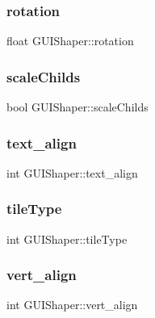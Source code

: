\subsubsection{\texorpdfstring{rotation}{rotation}}
{\footnotesize\ttfamily float G\+U\+I\+Shaper\+::rotation}

\hypertarget{class_g_u_i_shaper_a73e39b659b63446e2e224a08e68443f1}{}\label{class_g_u_i_shaper_a73e39b659b63446e2e224a08e68443f1} 
\subsubsection{\texorpdfstring{scale\+Childs}{scaleChilds}}
{\footnotesize\ttfamily bool G\+U\+I\+Shaper\+::scale\+Childs}

\hypertarget{class_g_u_i_shaper_a50f4050dfeeb3801ecb26cb14e4957d6}{}\label{class_g_u_i_shaper_a50f4050dfeeb3801ecb26cb14e4957d6} 
\subsubsection{\texorpdfstring{text\+\_\+align}{text\_align}}
{\footnotesize\ttfamily int G\+U\+I\+Shaper\+::text\+\_\+align}

\hypertarget{class_g_u_i_shaper_a7e7b2ee7596e285341608338a9789d81}{}\label{class_g_u_i_shaper_a7e7b2ee7596e285341608338a9789d81} 
\subsubsection{\texorpdfstring{tile\+Type}{tileType}}
{\footnotesize\ttfamily int G\+U\+I\+Shaper\+::tile\+Type}

\hypertarget{class_g_u_i_shaper_ad737cb87adefdda77a552858b77465b1}{}\label{class_g_u_i_shaper_ad737cb87adefdda77a552858b77465b1} 
\subsubsection{\texorpdfstring{vert\+\_\+align}{vert\_align}}
{\footnotesize\ttfamily int G\+U\+I\+Shaper\+::vert\+\_\+align}

